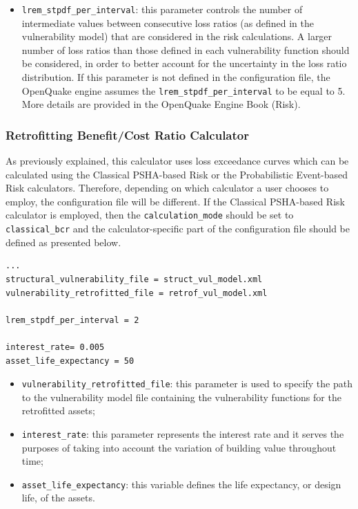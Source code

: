 \begin{itemize}
\item  \Verb+lrem_stpdf_per_interval+: this parameter controls the number of intermediate values between consecutive loss ratios (as defined in the \gls{vulnerability model}) that are considered in the risk calculations. A larger number of loss ratios than those defined in each \gls{vulnerability function} should be considered, in order to better account for the uncertainty in the loss ratio distribution. If this parameter is not defined in the configuration file, the OpenQuake engine assumes the \Verb+lrem_stpdf_per_interval+ to be equal to 5. More details are provided in the OpenQuake Engine Book (Risk).  
\end{itemize}

\subsubsection{Retrofitting Benefit/Cost Ratio Calculator}
As previously explained, this calculator uses loss exceedance curves which can be calculated using the Classical PSHA-based Risk or the Probabilistic Event-based Risk calculators. Therefore, depending on which calculator a user chooses to employ, the configuration file will be different. If the Classical PSHA-based Risk calculator is employed, then the \Verb+calculation_mode+ should be set to \texttt{clas\-si\-cal\_bcr} and the calculator-specific part of the configuration file should be defined as presented below.

\begin{Verbatim}[frame=single, commandchars=\\\{\}, samepage=true]
...
structural_vulnerability_file = struct_vul_model.xml
vulnerability_retrofitted_file = retrof_vul_model.xml

lrem_stpdf_per_interval = 2

interest_rate= 0.005
asset_life_expectancy = 50
\end{Verbatim}

\begin{itemize}
\item  \Verb+vulnerability_retrofitted_file+: this parameter is used to specify the path to the \gls{vulnerability model} file containing the \glspl{vulnerability function} for the retrofitted assets;  
\item  \Verb+interest_rate+: this parameter represents the interest rate and it serves the purposes of taking into account the variation of building value throughout time;
\item  \Verb+asset_life_expectancy+: this variable defines the life expectancy, or design life, of the assets.
\end{itemize}

